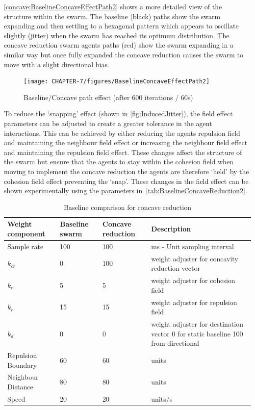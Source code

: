 \autoref{concave:BaselineConcaveEffectPath2} shows a more detailed view of the structure within the swarm. The baseline (black) paths show the swarm expanding and then settling to a hexagonal pattern which appears to oscillate slightly (jitter) when the swarm has reached its optimum distribution. The concave reduction swarm agents paths (red) show the swarm expanding in a similar way but once fully expanded the concave reduction causes the swarm to move with a slight directional bias.

\begin{figure}[H]
\begin{center}
\texttt{[image: CHAPTER-7/figures/BaselineConcaveEffectPath2]}
\end{center}
\caption{Baseline/Concave path effect (after 600 iterations / 60s)\label{concave:BaselineConcaveEffectPath2}}
\end{figure}

To reduce the `snapping' effect (shown in \autoref{fig:InducedJitter}), the field effect parameters can be adjusted to create a greater tolerance in the agent interactions. This can be achieved by either reducing the agents repulsion field and maintaining the neighbour field effect or increasing the neighbour field effect and maintaining the repulsion field effect. These changes affect the structure of the swarm but ensure that the agents to stay within the cohesion field when moving to implement the concave reduction the agents are therefore `held' by the cohesion field effect preventing the `snap'. These changes in the field effect can be shown experimentally using the parameters in~\autoref{tab:BaselineConcaveReduction2}. 

\begin{table}[H]
\begin{center}
\begin{tabular}{| p{2.3cm} | p{2cm} | p{2cm} | p{5cm} |}
\hline
\bf Weight \bf component & \bf Baseline \bf swarm & \bf Concave \bf reduction & \bf Description \\ \hline
Sample rate & 100 & 100 & ms - Unit sampling interval\\  \hline
$k_{cr}$ & 0 & 100 & weight adjuster for concavity reduction vector\\  \hline
$k_c$ & 5 & 5 & weight adjuster for cohesion field\\  \hline
$k_r$ & 15 & 15 & weight adjuster for repulsion field\\  \hline
$k_d$ & 0 & 0 & weight adjuster for destination vector 0 for static baseline 100 from directional\\  \hline
Repulsion Boundary & 60 & 60 & units\\  \hline
Neighbour Distance & 80 & 80 & units\\  \hline
Speed & 20 & 20 & units/s\\  \hline
\end{tabular}\caption{Baseline comparison for concave reduction} \label{tab:BaselineConcaveReduction2}
\end{center}
\end{table}

